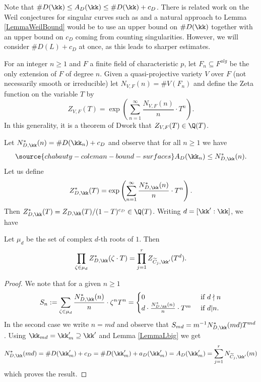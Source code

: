 Note that $\#D(\kk)\le A_D(\kk) \le \# D(\kk) + c_D$. There is related work on the Weil conjectures for singular curves such as \cite{AubryPerret} and a natural approach to Lemma \ref{LemmaWeilBound} would be to use an upper bound on $\#D(\kk)$ together with an upper bound on $c_D$ coming from counting singularities. However, we will consider $\#D(L)+c_D$ at once, as this leads to sharper estimates.


For an integer $n\ge 1$ and $F$ a finite field of characteristic $p$, let $F_n\subseteq F^{alg}$ be the only extension of $F$ of degree $n$. Given a quasi-projective variety $V$ over $F$ (not necessarily smooth or irreducible) let $N_{V,F}(n)=\# V(F_n)$ and define the Zeta function on the variable $T$ by
$$
Z_{V,F}(T)=\exp\left(\sum_{n=1}^\infty \frac{N_{V,F}(n)}{n}\cdot T^n\right).
$$
In this generality, it is a theorem of Dwork \cite{Dwork} that $Z_{V,F}(T)\in \Q(T)$.

Let $N^*_{D,\kk}(n)=\# D(\kk_n)+c_D$ and observe that for all $n\ge 1$ we have
\begin{equation}\label{EqnBdAD}
\source{chabauty-coleman-bound-surfaces}
A_D(\kk_n)\le N^*_{D,\kk}(n).
\end{equation}
Let us define
$$
Z^*_{D,\kk}(T)=\exp\left(\sum_{n=1}^\infty \frac{N^*_{D,\kk}(n)}{n}\cdot T^n\right).
$$
Then $Z^*_{D,\kk}(T)=Z_{D,\kk}(T)/(1-T)^{c_D}\in \Q(T)$. Writing $d=[\kk':\kk]$, we have
\begin{lemma}
\notready\label{LemmaZprod} Let $\mu_d$ be the set of complex $d$-th roots of $1$. Then
$$
\prod_{\zeta\in \mu_d} Z^*_{D,\kk}(\zeta\cdot T) = \prod_{j=1}^r Z_{\widetilde{C}_j,\kk'}(T^d).
$$
\end{lemma}
\begin{proof} We note that for a given $n\ge 1$
$$
S_n:=\sum_{\zeta\in \mu_d}\frac{N^*_{D,\kk}(n)}{n}\cdot \zeta^nT^n=
\begin{cases}
0 & \mbox{ if } d\nmid n\\
d\cdot \frac{N^*_{D,\kk}(n)}{n}\cdot T^m & \mbox{ if } d|n.
\end{cases}
$$
In the second case we write $n=md$ and observe that $S_{md} = m^{-1}N^*_{D,\kk}(md) T^{md}$. Using $\kk_{md}=\kk'_m\supseteq \kk'$ and Lemma \ref{LemmaLbig} we get
$$
N^*_{D,\kk}(md) =\# D(\kk'_m) + c_D=\# D(\kk'_m)+ a_D(\kk'_m)=A_D(\kk'_m)=\sum_{j=1}^r N_{\widetilde{C}_j,\kk'}(m)
$$
which proves the result.
\end{proof}

